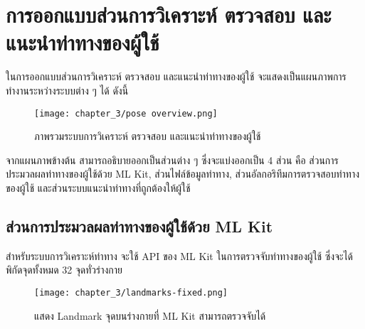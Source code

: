 \clearpage


\section{การออกแบบส่วนการวิเคราะห์ ตรวจสอบ และแนะนำท่าทางของผู้ใช้}
ในการออกแบบส่วนการวิเคราะห์ ตรวจสอบ และแนะนำท่าทางของผู้ใช้ จะแสดงเป็นแผนภาพการทำงานระหว่างระบบต่าง ๆ ได้ ดังนี้
\begin{figure}
    \texttt{[image: chapter\_3/pose overview.png]}
    \caption{ภาพรวมระบบการวิเคราะห์ ตรวจสอบ และแนะนำท่าทางของผู้ใช้}
\end{figure}
จากแผนภาพข้างต้น สามารถอธิบายออกเป็นส่วนต่าง ๆ ซึ่งจะแบ่งออกเป็น 4 ส่วน คือ ส่วนการประมวลผลท่าทางของผู้ใช้ด้วย ML Kit, ส่วนไฟล์ข้อมูลท่าทาง, ส่วนอัลกอริทึมการตรวจสอบท่าทางของผู้ใช้ และส่วนระบบแนะนำท่าทางที่ถูกต้องให้ผู้ใช้

\subsection{ส่วนการประมวลผลท่าทางของผู้ใช้ด้วย ML Kit}
สำหรับระบบการวิเคราะห์ท่าทาง จะใช้ API ของ ML Kit ในการตรวจจับท่าทางของผู้ใช้ ซึ่งจะได้พิกัดจุดทั้งหมด 32 จุดทั่วร่างกาย
\begin{figure}
    \texttt{[image: chapter\_3/landmarks-fixed.png]}
    \caption{แสดง Landmark จุดบนร่างกายที่ ML Kit สามารถตรวจจับได้}
\end{figure}

